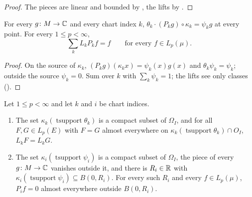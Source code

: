 \begin{proof}
\leanok
The pieces are linear and bounded by , the lifts by .
\end{proof}

\begin{lemma}
\label{lem:chart-retract}
\leanok
{}
For every $g \colon M \to \mathbb{C}$ and every chart index $k$,
$\theta_k \cdot (P_k g) \circ \kappa_k = \psi_k g$ at every point. For every $1 \leq p < \infty$,
\[
  \sum_k L_k P_k f = f \qquad \text{for every } f \in L_p(\mu) .
\]
\end{lemma}

\begin{proof}
\leanok
On the source of $\kappa_k$, $(P_k g)(\kappa_k x) = \psi_k(x) g(x)$ and
$\theta_k \psi_k = \psi_k$; outside the source $\psi_k = 0$. Sum over $k$ with
$\sum_k \psi_k = 1$; the lifts see only classes ().
\end{proof}

\begin{lemma}
\label{lem:chart-carriers}
\leanok
{}
Let $1 \leq p < \infty$ and let $k$ and $i$ be chart indices.
\begin{enumerate}
  \item The set $\kappa_k(\operatorname{tsupport} \theta_k)$ is a compact subset of $\Omega_I$,
    and for all $F, G \in L_p(E)$ with $F = G$ almost everywhere on
    $\kappa_k(\operatorname{tsupport} \theta_k) \cap O_I$, $L_k F = L_k G$.
  \item The set $\kappa_i(\operatorname{tsupport} \psi_i)$ is a compact subset of $\Omega_I$, the
    piece of every
    $g \colon M \to \mathbb{C}$ vanishes outside it, and there is $R_i \in \mathbb{R}$ with
    $\kappa_i(\operatorname{tsupport} \psi_i) \subseteq B(0, R_i)$. For every such $R_i$ and every
    $f \in L_p(\mu)$, $P_i f = 0$ almost everywhere outside $B(0, R_i)$.
\end{enumerate}
\end{lemma}

